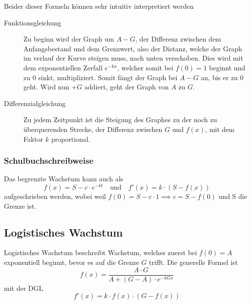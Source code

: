 \documentclass{article}
\begin{document}
\vspace{1em} 
\noindent Beider dieser Formeln können sehr intuitiv interpretiert werden 
\begin{description}
 \item[Funktionsgleichung] Zu beginn wird der Graph um $A-G$, der Differenz zwischen dem Anfangsbestand und dem Grenzwert, also der Distanz, welche der Graph im verlauf der Kurve steigen muss, nach unten verschoben. Dies wird mit dem exponentiellen Zerfall $e^{-kx}$, welcher somit bei $f(0)=1$ beginnt und zu $0$ sinkt, multipliziert. Somit fängt der Graph bei $A-G$ an, bis er zu $0$ geht. Wird nun $+G$ addiert, geht der Graph von $A$ zu $G$.
 \item[Differenzialgleichung] Zu jedem Zeitpunkt ist die Steigung des Graphes zu der noch zu überquerenden Strecke, der Differenz zwischen $G$ und $f(x)$, mit dem Faktor $k$ proportional.
\end{description} 
\subsubsection{Schulbuchschreibweise}
Das begrenzte Wachstum kann auch als
\[
 f(x) = S-c \cdot e^{-kt}
 \quad \text{und} \quad
 f'(x) = k \cdot (S - f(x)) 
\]
aufgeschrieben werden, wobei weil $f(0) = S - c \cdot 1 \implies c = S - f(0)$ und S die Grenze ist. 
 
\subsection{Logistisches Wachstum} 
\begin{minipage}{6cm}
  \centering
\end{minipage}
\hfill
\begin{minipage}{\dimexpr\textwidth-6cm}  
Logistisches Wachstum beschreibt Wachstum, welches zuerst bei $f(0)=A$ exponentiell beginnt, bevor es auf die Grenze $G$ trifft.
Die generelle Formel ist
\[
 f(x) = \frac{A \cdot G}{A+(G-A) \cdot e^{-kGx}}
\]
mit der DGL
\[
 f'(x) = k \cdot f(x) \cdot (G-f(x))
\]
\end{minipage}
 
\end{document}
